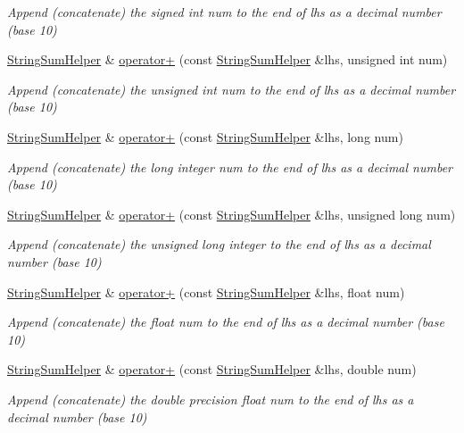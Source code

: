 \begin{DoxyCompactItemize}
\begin{DoxyCompactList}\small\item\em Append (concatenate) the signed int num to the end of lhs as a decimal number (base 10) \end{DoxyCompactList}\item 
\hyperlink{class_string_sum_helper}{String\+Sum\+Helper} \& \hyperlink{class_string_a20c7726a6ea2c053044c19f40e5c91aa}{operator+} (const \hyperlink{class_string_sum_helper}{String\+Sum\+Helper} \&lhs, unsigned int num)
\begin{DoxyCompactList}\small\item\em Append (concatenate) the unsigned int num to the end of lhs as a decimal number (base 10) \end{DoxyCompactList}\item 
\hyperlink{class_string_sum_helper}{String\+Sum\+Helper} \& \hyperlink{class_string_a50aa43ee66fafd4a7e03c453a62aaac1}{operator+} (const \hyperlink{class_string_sum_helper}{String\+Sum\+Helper} \&lhs, long num)
\begin{DoxyCompactList}\small\item\em Append (concatenate) the long integer num to the end of lhs as a decimal number (base 10) \end{DoxyCompactList}\item 
\hyperlink{class_string_sum_helper}{String\+Sum\+Helper} \& \hyperlink{class_string_a61625af689cfcbe9206851903b1144a2}{operator+} (const \hyperlink{class_string_sum_helper}{String\+Sum\+Helper} \&lhs, unsigned long num)
\begin{DoxyCompactList}\small\item\em Append (concatenate) the unsigned long integer to the end of lhs as a decimal number (base 10) \end{DoxyCompactList}\item 
\hyperlink{class_string_sum_helper}{String\+Sum\+Helper} \& \hyperlink{class_string_a9a2cbb5207527b7dabf2ea13c48f9833}{operator+} (const \hyperlink{class_string_sum_helper}{String\+Sum\+Helper} \&lhs, float num)
\begin{DoxyCompactList}\small\item\em Append (concatenate) the float num to the end of lhs as a decimal number (base 10) \end{DoxyCompactList}\item 
\hyperlink{class_string_sum_helper}{String\+Sum\+Helper} \& \hyperlink{class_string_ad7f8cc6402796f520aa6ddc33953f7fc}{operator+} (const \hyperlink{class_string_sum_helper}{String\+Sum\+Helper} \&lhs, double num)
\begin{DoxyCompactList}\small\item\em Append (concatenate) the double precision float num to the end of lhs as a decimal number (base 10) \end{DoxyCompactList}\end{DoxyCompactItemize}


